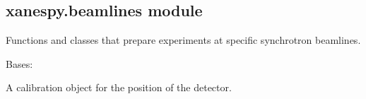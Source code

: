 \documentclass[letterpaper,10pt,english]{sphinxmanual}
\begin{document}
\subsection{xanespy.beamlines module}
\label{\detokenize{xanespy:module-xanespy.beamlines}}\label{\detokenize{xanespy:xanespy-beamlines-module}}
Functions and classes that prepare experiments at specific
synchrotron beamlines.

\begin{fulllineitems}
\label{\detokenize{xanespy:xanespy.beamlines.Detector}}
Bases: {\hyperref[\detokenize{xanespy:xanespy.beamlines.Zoneplate}]{}}

A calibration object for the position of the detector.

\end{fulllineitems}

\end{document}
